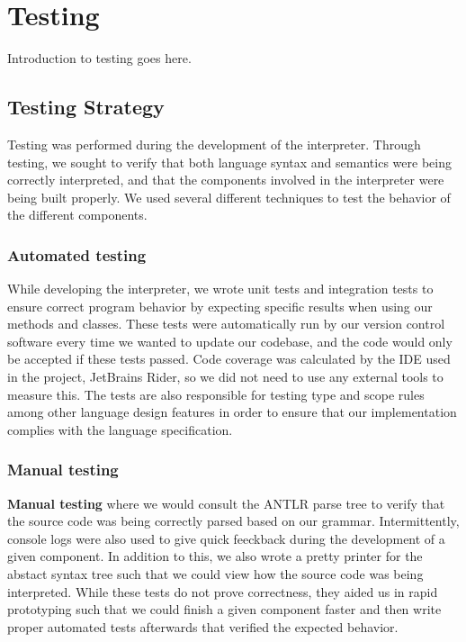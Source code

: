 \chapter{Testing}

Introduction to testing goes here.

\section{Testing Strategy}
Testing was performed during the development of the \dazel{} interpreter. 
Through testing, we sought to verify that both language syntax and semantics were being correctly interpreted, and that the components involved in the interpreter were being built properly.
We used several different techniques to test the behavior of the different components. 

\subsection*{Automated testing}
While developing the interpreter, we wrote unit tests and integration tests to ensure correct program behavior by expecting specific results when using our methods and classes. 
These tests were automatically run by our version control software every time we wanted to update our codebase, and the code would only be accepted if these tests passed.
Code coverage was calculated by the IDE used in the project, JetBrains Rider, so we did not need to use any external tools to measure this\cite{rider_test_coverage}.
The tests are also responsible for testing type and scope rules among other language design features in order to ensure that our implementation complies with the language specification.

\subsection*{Manual testing}
\textbf{Manual testing} where we would consult the ANTLR parse tree to verify that the source code was being correctly parsed based on our grammar. 
Intermittently, console logs were also used to give quick feeckback during the development of a given component.
In addition to this, we also wrote a pretty printer for the abstact syntax tree such that we could view how the source code was being interpreted.
While these tests do not prove correctness, they aided us in rapid prototyping such that we could finish a given component faster and then write proper automated tests afterwards that verified the expected behavior.  


